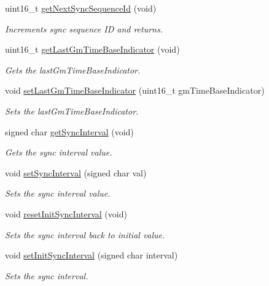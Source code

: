 \begin{DoxyCompactItemize}
uint16\+\_\+t \hyperlink{class_common_port_a05aaa48d87d2fbb2f3c9be81a458119f}{get\+Next\+Sync\+Sequence\+Id} (void)
\begin{DoxyCompactList}\small\item\em Increments sync sequence ID and returns. \end{DoxyCompactList}\item 
uint16\+\_\+t \hyperlink{class_common_port_ab3a3494bfdbdad33855f665c9335ac64}{get\+Last\+Gm\+Time\+Base\+Indicator} (void)
\begin{DoxyCompactList}\small\item\em Gets the last\+Gm\+Time\+Base\+Indicator. \end{DoxyCompactList}\item 
void \hyperlink{class_common_port_a038a307b29400d98300cf0dd1674aa56}{set\+Last\+Gm\+Time\+Base\+Indicator} (uint16\+\_\+t gm\+Time\+Base\+Indicator)
\begin{DoxyCompactList}\small\item\em Sets the last\+Gm\+Time\+Base\+Indicator. \end{DoxyCompactList}\item 
signed char \hyperlink{class_common_port_a963da67f8dd0b8c72bd19ca91c3ce00d}{get\+Sync\+Interval} (void)
\begin{DoxyCompactList}\small\item\em Gets the sync interval value. \end{DoxyCompactList}\item 
void \hyperlink{class_common_port_a0aff2cd89fbc637b4b883a47728f94df}{set\+Sync\+Interval} (signed char val)
\begin{DoxyCompactList}\small\item\em Sets the sync interval value. \end{DoxyCompactList}\item 
void \hyperlink{class_common_port_a7e4b6dfc0822ebebb0874ed2bdd91b10}{reset\+Init\+Sync\+Interval} (void)
\begin{DoxyCompactList}\small\item\em Sets the sync interval back to initial value. \end{DoxyCompactList}\item 
void \hyperlink{class_common_port_a1af3691c565a65c9212b3f0adf1f76ac}{set\+Init\+Sync\+Interval} (signed char interval)
\begin{DoxyCompactList}\small\item\em Sets the sync interval. \end{DoxyCompactList}\item 

\end{DoxyCompactItemize}
